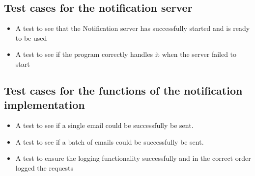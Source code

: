 \documentclass[11pt]{article}
\begin{document}
		\subsection{Test cases for the notification server}
			\begin{itemize}
				\item A test to see that the Notification server has successfully started and is ready to be used
				\item A test to see if the program correctly handles it when the server failed to start	
			\end{itemize}
		\subsection{Test cases for the functions of the notification implementation}
			\begin{itemize}
				\item A test to see if a single email could be successfully be sent.
				\item A test to see if a batch of emails could be successfully be sent.
				\item A test to ensure the logging functionality successfully and in the correct order logged the requests
			\end{itemize}


	
	
\end{document}
